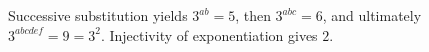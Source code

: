 Successive substitution yields $3^{ab}=5$, then $3^{abc}=6$, and ultimately $3^{abcdef}=9=3^2$. Injectivity of exponentiation gives $\boxed2$.
